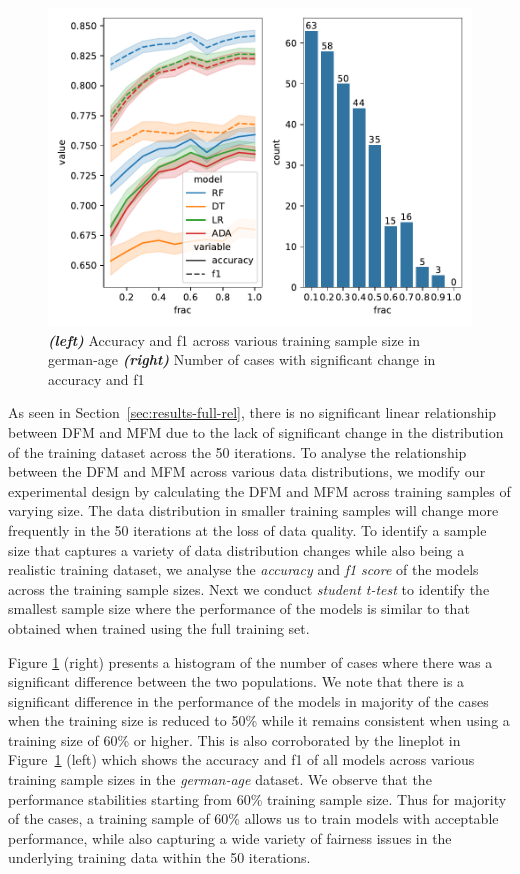 \documentclass{article}
\begin{document}
\begin{figure}
  \centering
  \includegraphics[width=0.95\linewidth]{training-set-frac-threshold.pdf}
  \caption{\emph{\textbf{(left)}} Accuracy and f1 across various
    training sample size in german-age \emph{\textbf{(right)}} Number
    of cases with significant change in accuracy and f1}
  \label{fig:training-set-frac-threshold}
\end{figure}

As seen in Section \ref{sec:results-full-rel}, there is no significant
linear relationship between DFM and MFM due to the lack of significant
change in the distribution of the training dataset across the 50
iterations. To analyse the relationship between the DFM and MFM across
various data distributions, we modify our experimental design by
calculating the DFM and MFM across training samples of varying size.
The data distribution in smaller training samples will change more
frequently in the 50 iterations at the loss of data quality. To
identify a sample size that captures a variety of data distribution
changes while also being a realistic training dataset, we analyse the
\emph{accuracy} and \emph{f1 score} of the models across the training
sample sizes. Next we conduct \emph{student t-test} to identify the
smallest sample size where the performance of the models is similar to
that obtained when trained using the full training set.

Figure \ref{fig:training-set-frac-threshold} (right) presents
a histogram of the number of cases where there was a significant
difference between the two populations. We note that there is
a significant difference in the performance of the models in majority
of the cases when the training size is reduced to 50\% while it
remains consistent when using a training size of 60\% or higher. This
is also corroborated by the lineplot in
Figure \ref{fig:training-set-frac-threshold} (left) which shows the
accuracy and f1 of all models across various training sample sizes in
the \emph{german-age} dataset. We observe that the performance
stabilities starting from 60\% training sample size. Thus for majority
of the cases, a training sample of 60\% allows us to train models with
acceptable performance, while also capturing a wide variety of
fairness issues in the underlying training data within the 50
iterations.
\end{document}
